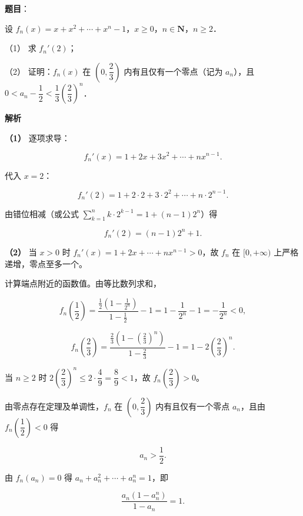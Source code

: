 \begin{answer}

\textbf{题目}：

设 $f_{n}(x)=x+x^{2}+\cdots+x^{n}-1$，$x\ge 0$，$n\in\mathbf{N}$，$n\ge 2$．

（1） 求 $f_{n}'(2)$；

（2） 证明：$f_{n}(x)$ 在 $\left(0,\dfrac{2}{3}\right)$ 内有且仅有一个零点（记为 $a_{n}$），且 $0<a_{n}-\dfrac{1}{2}<\dfrac{1}{3}\left(\dfrac{2}{3}\right)^{n}$．

\textbf{解析}

\textbf{（1）} 逐项求导：

\nopagebreak[4]
\[
f_{n}'(x)=1+2x+3x^{2}+\cdots+nx^{n-1}.
\]

代入 $x=2$：

\nopagebreak[4]
\[
f_{n}'(2)=1+2\cdot 2+3\cdot 2^{2}+\cdots+n\cdot 2^{n-1}.
\]

由错位相减（或公式 $\displaystyle\sum_{k=1}^{n}k\cdot 2^{k-1}=1+(n-1)2^{n}$）得

\nopagebreak[4]
\[
f_{n}'(2)=(n-1)2^{n}+1.
\]

\textbf{（2）} 当 $x>0$ 时 $f_{n}'(x)=1+2x+\cdots+nx^{n-1}>0$，故 $f_{n}$ 在 $[0,+\infty)$ 上严格递增，零点至多一个。

计算端点附近的函数值。由等比数列求和，

\nopagebreak[4]
\[
f_{n}\left(\frac{1}{2}\right)=\frac{\frac{1}{2}\left(1-\frac{1}{2^{n}}\right)}{1-\frac{1}{2}}-1=1-\frac{1}{2^{n}}-1=-\frac{1}{2^{n}}<0,
\]

\nopagebreak[4]
\[
f_{n}\left(\frac{2}{3}\right)=\frac{\frac{2}{3}\left(1-\left(\frac{2}{3}\right)^{n}\right)}{1-\frac{2}{3}}-1=1-2\left(\frac{2}{3}\right)^{n}.
\]

当 $n\ge 2$ 时 $2\left(\dfrac{2}{3}\right)^{n}\le 2\cdot\dfrac{4}{9}=\dfrac{8}{9}<1$，故 $f_{n}\left(\dfrac{2}{3}\right)>0$。

由零点存在定理及单调性，$f_{n}$ 在 $\left(0,\dfrac{2}{3}\right)$ 内有且仅有一个零点 $a_{n}$，且由 $f_{n}\left(\dfrac{1}{2}\right)<0$ 得

\nopagebreak[4]
\[
a_{n}>\frac{1}{2}.
\]

由 $f_{n}(a_{n})=0$ 得 $a_{n}+a_{n}^{2}+\cdots+a_{n}^{n}=1$，即

\nopagebreak[4]
\[
\frac{a_{n}\left(1-a_{n}^{n}\right)}{1-a_{n}}=1.
\]


\end{answer}
